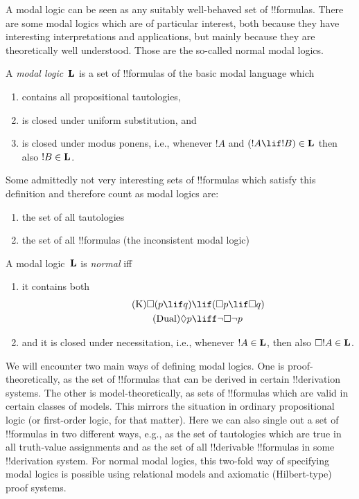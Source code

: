 \documentclass[../../../include/open-logic-section]{subfiles}
\begin{document}


A modal logic can be seen as any suitably well-behaved set of
!!{formula}s.  There are some modal logics which are of particular
interest, both because they have interesting interpretations and
applications, but mainly because they are theoretically well
understood.  Those are the so-called normal modal logics.

\begin{defn}
A \emph{modal logic}~$\mathbf{L}$ is a set of !!{formula}s of the basic
modal language which 
\begin{enumerate}
\item contains all propositional tautologies, 
\item is closed under uniform substitution, and 
\item is closed under modus ponens, i.e., whenever $!A$ and $(!A \lif
  !B) \in \Log L$ then also $!B \in \mathbf{L}$.
\end{enumerate}
\end{defn}

\begin{ex}
Some admittedly not very interesting sets of !!{formula}s which
satisfy this definition and therefore count as modal logics are:
\begin{enumerate}
\item the set of all tautologies
\item the set of all !!{formula}s (the inconsistent modal logic)
\end{enumerate}
\end{ex}

\begin{defn}\label{defn:normal-modal-logic}
A modal logic~$\mathbf{L}$ is \emph{normal} iff 
\begin{enumerate}
\item it contains both
\begin{align}
\tag{K} \Box(p \lif q) & \lif (\Box p \lif \Box q) \\
\tag{Dual} \Diamond p & \liff \lnot \Box \lnot p
\end{align}
\item and it is closed under necessitation, i.e., whenever $!A \in
  \mathbf{L}$, then also $\Box !A \in \mathbf{L}$.
\end{enumerate}
\end{defn}

We will encounter two main ways of defining modal logics.  One is
proof-theoretically, as the set of !!{formula}s that can be derived in
certain !!{derivation} systems. The other is model-theoretically, as
sets of !!{formula}s which are valid in certain classes of
models. This mirrors the situation in ordinary propositional logic (or
first-order logic, for that matter).  Here we can also single out a
set of !!{formula}s in two different ways, e.g., as the set of
tautologies which are true in all truth-value assignments and as the
set of all !!{derivable} !!{formula}s in some !!{derivation} system.
For normal modal logics, this two-fold way of specifying modal logics
is possible using relational models and axiomatic (Hilbert-type) proof
systems.
\end{document}
